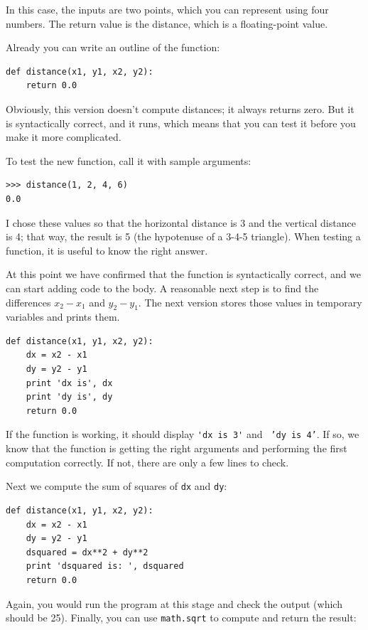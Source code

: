 \documentclass[10pt]{book}
\begin{document}
\begin{CJK}{UTF8}{gbsn}
In this case, the inputs are two points, which you can represent
using four numbers.  The return value is the distance, which is
a floating-point value.

Already you can write an outline of the function:

\begin{verbatim}
def distance(x1, y1, x2, y2):
    return 0.0
\end{verbatim}
%
Obviously, this version doesn't compute distances; it always returns
zero.  But it is syntactically correct, and it runs, which means that
you can test it before you make it more complicated.

To test the new function, call it with sample arguments:

\begin{verbatim}
>>> distance(1, 2, 4, 6)
0.0
\end{verbatim}
%
I chose these values so that the horizontal distance is 3 and the
vertical distance is 4; that way, the result is 5
(the hypotenuse of a 3-4-5 triangle). When testing a function, it is
useful to know the right answer.

At this point we have confirmed that the function is syntactically
correct, and we can start adding code to the body.
A reasonable next step is to find the differences
$x_2 - x_1$ and $y_2 - y_1$.  The next version stores those values in
temporary variables and prints them.

\begin{verbatim}
def distance(x1, y1, x2, y2):
    dx = x2 - x1
    dy = y2 - y1
    print 'dx is', dx
    print 'dy is', dy
    return 0.0
\end{verbatim}
%
If the function is working, it should display \verb"'dx is 3'" and {\tt
'dy is 4'}.  If so, we know that the function is getting the right
arguments and performing the first computation correctly.  If not,
there are only a few lines to check.

Next we compute the sum of squares of {\tt dx} and {\tt dy}:

\begin{verbatim}
def distance(x1, y1, x2, y2):
    dx = x2 - x1
    dy = y2 - y1
    dsquared = dx**2 + dy**2
    print 'dsquared is: ', dsquared
    return 0.0
\end{verbatim}
%
Again, you would run the program at this stage and check the output
(which should be 25).
Finally, you can use {\tt math.sqrt} to compute and return the result:


\end{CJK}
\end{document}
